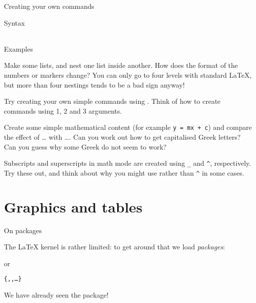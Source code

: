\begin{frame}{Creating your own commands}

  \begin{block}{Syntax}
    \\
      \\
  \end{block}
  
  \begin{block}{Examples}
     \\
  \end{block}

\end{frame}

\begin{exercise}
  Make some lists, and nest one list inside another. How does the
  format of the numbers or markers change? You can only go to
  four levels with standard \LaTeX{}, but more than four nestings
  tends to be a bad sign anyway!

  Try creating your own simple commands using . Think of
  how to create commands using 1, 2 and 3 arguments.
  
  Create some simple mathematical content (for example \verb"y = mx + c")
  and compare the effect of \cs{(} \ldots \cs{)} with \cs{[} \ldots \cs{]}.
  Can you work out how to get capitalised Greek letters? Can you
  guess why some Greek do not seem to work?
  
  Subscripts and superscripts in math mode are created using \verb"_"
  and \verb"^", respectively. Try these out, and think about why you
  might use  rather than \verb"^" in some cases.
\end{exercise}


\section{Graphics and tables}

\begin{frame}[fragile]{On packages}

  The \LaTeX{} kernel is rather limited: to get around that we
  load \emph{packages}:
  \begin{semiverbatim}
  \end{semiverbatim}
  or
  \begin{semiverbatim}
\texttt{\{,,\ldots\}}
  \end{semiverbatim} 
  We have already seen the  package! 
  
  \vspace{1 em}
  
  
\end{frame}

